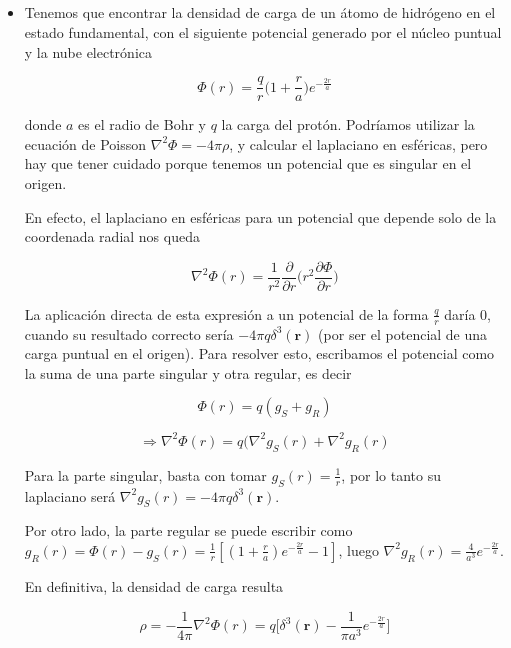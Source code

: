 \subsection{}

\begin{itemize}
    \item Tenemos que encontrar la densidad de carga de un \'atomo de hidr\'ogeno en el estado fundamental, con el siguiente potencial generado por el n\'ucleo puntual y la nube electr\'onica

    $$\Phi(r) = \frac{q}{r}\bigg(1 + \frac{r}{a} \bigg)e^{-\frac{2r}{a}}$$

    donde $a$ es el radio de Bohr y $q$ la carga del prot\'on. Podr\'iamos utilizar la ecuaci\'on de Poisson $\nabla^{2} \Phi = -4\pi \rho$,  y calcular el laplaciano en esf\'ericas, pero hay que tener cuidado porque tenemos un potencial que es singular en el origen. \newline

    En efecto, el laplaciano en esf\'ericas para un potencial que depende solo de la coordenada radial nos queda

    $$\nabla^{2} \Phi(r) = \frac{1}{r^{2}}\frac{\partial}{\partial r}\bigg(r^{2}\frac{\partial \Phi}{\partial r} \bigg)$$

    La aplicaci\'on directa de esta expresi\'on a un potencial de la forma $\frac{q}{r}$ dar\'ia 0, cuando su resultado correcto ser\'ia $-4\pi q \delta^{3}(\mathbf{r})$ (por ser el potencial de una carga puntual en el origen). Para resolver esto, escribamos el potencial como la suma de una parte singular y otra regular, es decir

    $$\Phi(r) = q(g_{S} + g_{R})$$

    $$\Rightarrow \nabla^{2} \Phi(r) = q(\nabla^{2} g_{S}(r) + \nabla^{2} g_{R}(r)$$

    Para la parte singular, basta con tomar $g_{S}(r) = \frac{1}{r}$, por lo tanto su laplaciano ser\'a $\nabla^{2} g_{S}(r) = -4\pi q \delta^{3}(\mathbf{r})$.\newline

    Por otro lado, la parte regular se puede escribir como $g_{R}(r) = \Phi(r) - g_{S}(r) = \frac{1}{r}[(1 + \frac{r}{a})e^{-\frac{2r}{a}} - 1]$, luego $\nabla^{2} g_{R}(r) = \frac{4}{a^{3}}e^{-\frac{2r}{a}}$.\newline

    En definitiva, la densidad de carga resulta

    $$\rho = -\frac{1}{4\pi}\nabla^{2} \Phi(r) = q\bigg[\delta^{3}(\mathbf{r}) - \frac{1}{\pi a^{3}}e^{-\frac{2r}{a}}\bigg]$$


\end{itemize}
